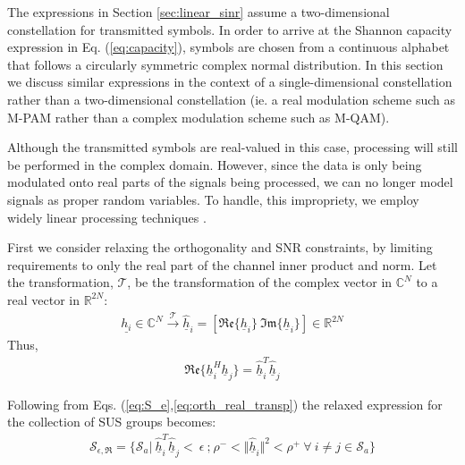 The expressions in Section \ref{sec:linear_sinr} assume a two-dimensional constellation for transmitted symbols. In order to arrive at the Shannon capacity expression in Eq. (\ref{eq:capacity}), symbols are chosen from a continuous alphabet that follows a circularly symmetric complex normal distribution. In this section we discuss similar expressions in the context of a single-dimensional constellation rather than a two-dimensional constellation (ie. a real modulation scheme such as M-PAM rather than a complex modulation scheme such as M-QAM).

Although the transmitted symbols are real-valued in this case, processing will still be performed in the complex domain. However, since the data is only being modulated onto real parts of the signals being processed, we can no longer model signals as proper random variables. To handle, this impropriety, we employ widely linear processing techniques \cite{Adali2011}.

First we consider relaxing the orthogonality and SNR constraints, by limiting  requirements to only the real part of the channel inner product and norm.  Let the  transformation, $\mathcal{T}$, be the transformation of the complex vector in $\mathbb{C}^N$ to a real vector in $\mathbb{R}^{2N}$:
\begin{equation}\label{eq:complex_real_xform}
    \begin{aligned}
        \underline{h_i} \in \mathbb{C}^N \xrightarrow{\mathcal{T}} \hat{\underline{h}}_i = [ \mathfrak{Re} \lbrace \underline{h}_i \rbrace \ \mathfrak{Im}\lbrace \underline{h}_i \rbrace ] \in \mathbb{R}^{2N}
    \end{aligned}
\end{equation}
Thus,
\begin{equation}\label{eq:orth_real_transp}
    \begin{aligned}
        \mathfrak{Re} \lbrace \underline{h}_i^H\underline{h}_j \rbrace = \hat{\underline{h}}_i^T \hat{\underline{h}}_j 
    \end{aligned}
\end{equation}

Following from Eqs. (\ref{eq:S_e},\ref{eq:orth_real_transp}) the relaxed expression for the collection of SUS groups becomes:
\begin{equation}\label{eq:wl_S_e}
    \begin{aligned}
        \mathcal{S}_{\epsilon,\mathfrak{R}} = \lbrace \mathcal{S}_a \big|\  \hat{\underline{h}}_i^T \hat{\underline{h}}_j<\ \epsilon \ \text{;} \ \rho^-<\Vert \hat{\underline{h}}_i \Vert^2 < \rho^+\ \forall \ i \neq j \in \mathcal{S}_a \rbrace
    \end{aligned}
\end{equation}

